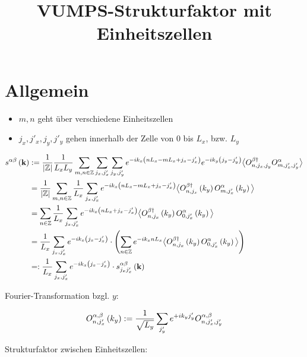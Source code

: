 \documentclass[12pt,paper=a4,BCOR=16mm]{article}
\title{VUMPS-Strukturfaktor mit Einheitszellen}
\begin{document}
\maketitle

\section{Allgemein}

\begin{itemize}
\item $m,n$ geht \"uber verschiedene Einheitszellen
\item $j_x,j'_x,j_y,j'_y$ gehen innerhalb der Zelle von $0$ bis $L_x$, bzw. $L_y$
\end{itemize}

\begin{equation}
\begin{split}
s^{\alpha\beta}\left(\mathbf{k}\right) &:=\frac{1}{\left|\mathbb{Z}\right|}  \frac{1}{L_xL_y} \sum_{m,n\in\mathbb{Z}} \sum_{j_x,j'_x} \sum_{j_y,j'_y} e^{-ik_x\left(nL_x-mL_x+j_x-j'_x\right)} e^{-ik_y\left(j_y-j'_y\right)} \big< O^{\beta\dagger}_{n,j_x,j_y} O^{\alpha}_{m,j'_x,j'_y} \big>\\
                      &= \frac{1}{\left|\mathbb{Z}\right|} \sum_{m,n\in\mathbb{Z}} \frac{1}{L_x} \sum_{j_x,j'_x} e^{-ik_x\left(nL_x-mL_x+j_x-j'_x\right)} \big< O^{\beta\dagger}_{n,j_x}\left(k_y\right) O^{\alpha}_{m,j'_x}\left(k_y\right) \big>\\
                      &= \sum_{n\in\mathbb{Z}} \frac{1}{L_x} \sum_{j_x,j'_x} e^{-ik_x\left(nL_x+j_x-j'_x\right)} \big< O^{\beta\dagger}_{n,j_x}\left(k_y\right) O^{\alpha}_{0,j'_x}\left(k_y\right) \big>\\
                      &= \frac{1}{L_x} \sum_{j_x,j'_x} e^{-ik_x\left(j_x-j'_x\right)} \cdot \left( \sum_{n\in\mathbb{Z}} e^{-ik_xnL_x} \big< O^{\beta\dagger}_{n,j_x}\left(k_y\right) O^{\alpha}_{0,j'_x}\left(k_y\right) \big> \right)\\
                      &=: \frac{1}{L_x} \sum_{j_x,j'_x} e^{-ik_x\left(j_x-j'_x\right)} \cdot s^{\alpha\beta}_{j_xj'_x}\left(\mathbf{k}\right)
\end{split}
\end{equation}

Fourier-Transformation bzgl. $y$:

\begin{equation}
O^{\alpha,\beta}_{n,j'_x}\left(k_y\right) := \frac{1}{\sqrt{L_y}} \sum_{j'_y} e^{+ik_yj'_y} O^{\alpha,\beta}_{n,j'_x,j'_y}
\end{equation}

Strukturfaktor zwischen Einheitszellen:
\end{document}
